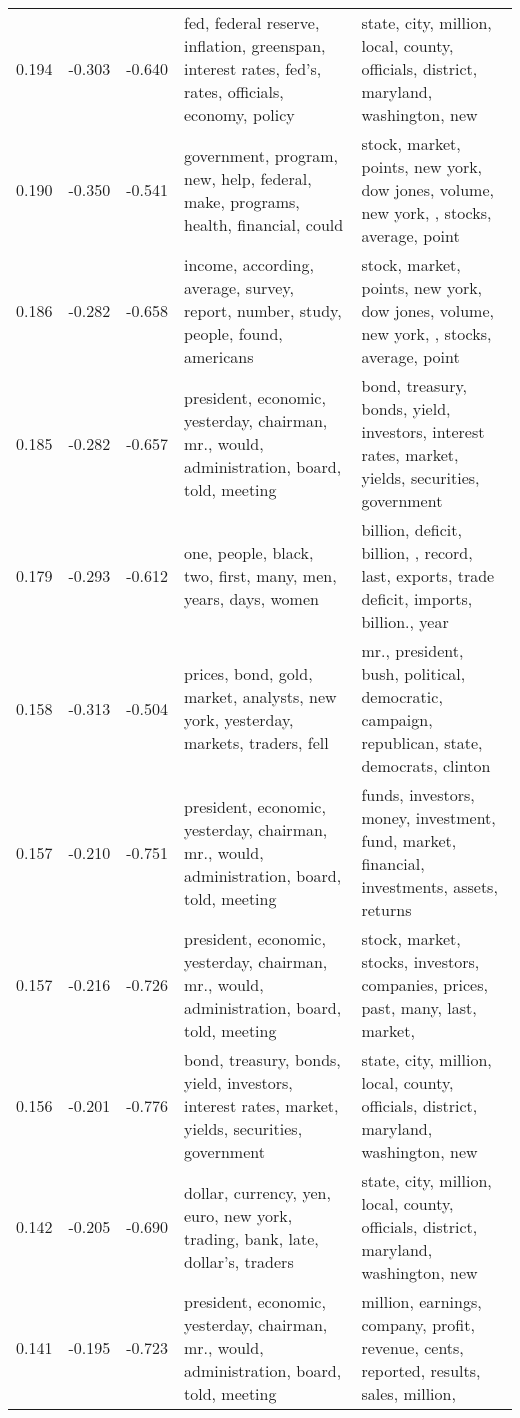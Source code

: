 \begin{tabular}{cccp{5cm}p{5cm}}
0.194 & -0.303 & -0.640 & fed, federal reserve, inflation, greenspan, interest rates, fed's, rates, officials, economy, policy & state, city, million, local, county, officials, district, maryland, washington, new \\
0.190 & -0.350 & -0.541 & government, program, new, help, federal, make, programs, health, financial, could & stock, market, points, new york, dow jones, volume, new york, , stocks, average, point \\
0.186 & -0.282 & -0.658 & income, according, average, survey, report, number, study, people, found, americans & stock, market, points, new york, dow jones, volume, new york, , stocks, average, point \\
0.185 & -0.282 & -0.657 & president, economic, yesterday, chairman, mr., would, administration, board, told, meeting & bond, treasury, bonds, yield, investors, interest rates, market, yields, securities, government \\
0.179 & -0.293 & -0.612 & one, people, black, two, first, many, men, years, days, women & billion, deficit, billion, , record, last, exports, trade deficit, imports, billion., year \\
0.158 & -0.313 & -0.504 & prices, bond, gold, market, analysts, new york, yesterday, markets, traders, fell & mr., president, bush, political, democratic, campaign, republican, state, democrats, clinton \\
0.157 & -0.210 & -0.751 & president, economic, yesterday, chairman, mr., would, administration, board, told, meeting & funds, investors, money, investment, fund, market, financial, investments, assets, returns \\
0.157 & -0.216 & -0.726 & president, economic, yesterday, chairman, mr., would, administration, board, told, meeting & stock, market, stocks, investors, companies, prices, past, many, last, market,  \\
0.156 & -0.201 & -0.776 & bond, treasury, bonds, yield, investors, interest rates, market, yields, securities, government & state, city, million, local, county, officials, district, maryland, washington, new \\
0.142 & -0.205 & -0.690 & dollar, currency, yen, euro, new york, trading, bank, late, dollar's, traders & state, city, million, local, county, officials, district, maryland, washington, new \\
0.141 & -0.195 & -0.723 & president, economic, yesterday, chairman, mr., would, administration, board, told, meeting & million, earnings, company, profit, revenue, cents, reported, results, sales, million,  \\

\end{tabular}
